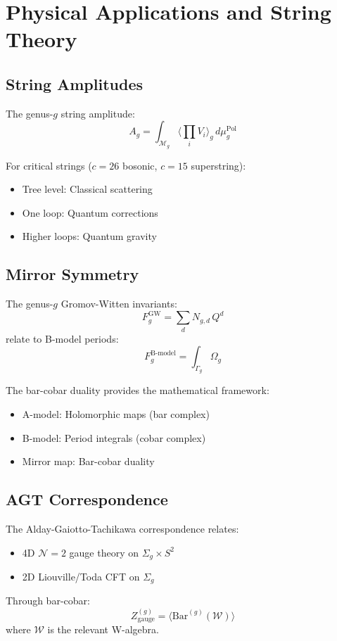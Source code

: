 \chapter{Physical Applications and String Theory}

\section{String Amplitudes}

The genus-$g$ string amplitude:
$$A_g = \int_{\mathcal{M}_g} \langle \prod_i V_i \rangle_g \, d\mu_g^{\text{Pol}}$$

For critical strings ($c=26$ bosonic, $c=15$ superstring):
\begin{itemize}
\item Tree level: Classical scattering
\item One loop: Quantum corrections
\item Higher loops: Quantum gravity
\end{itemize}

\section{Mirror Symmetry}

The genus-$g$ Gromov-Witten invariants:
$$F_g^{\text{GW}} = \sum_{d} N_{g,d} \, Q^d$$
relate to B-model periods:
$$F_g^{\text{B-model}} = \int_{\Gamma_g} \Omega_g$$

The bar-cobar duality provides the mathematical framework:
\begin{itemize}
\item A-model: Holomorphic maps (bar complex)
\item B-model: Period integrals (cobar complex)
\item Mirror map: Bar-cobar duality
\end{itemize}

\section{AGT Correspondence}

The Alday-Gaiotto-Tachikawa correspondence relates:
\begin{itemize}
\item 4D $\mathcal{N}=2$ gauge theory on $\Sigma_g \times S^2$
\item 2D Liouville/Toda CFT on $\Sigma_g$
\end{itemize}

Through bar-cobar:
$$Z_{\text{gauge}}^{(g)} = \langle \text{Bar}^{(g)}(\mathcal{W}) \rangle$$
where $\mathcal{W}$ is the relevant W-algebra.

